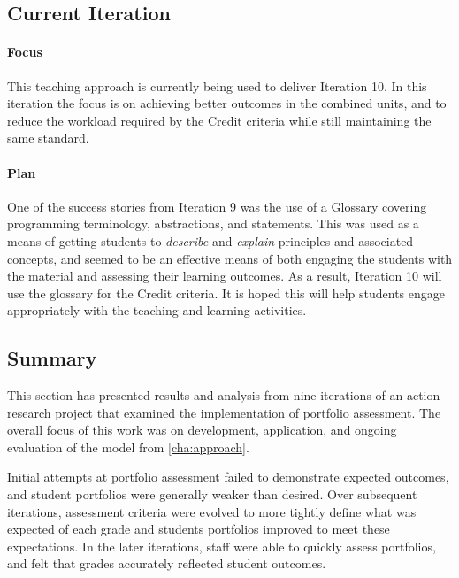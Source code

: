 \subsection{Current Iteration} %

\paragraph{Focus}
This teaching approach is currently being used to deliver Iteration 10. In this iteration the focus is on achieving better outcomes in the combined units, and to reduce the workload required by the Credit criteria while still maintaining the same standard.

\paragraph{Plan}
One of the success stories from Iteration 9 was the use of a Glossary covering programming terminology, abstractions, and statements. This was used as a means of getting students to \emph{describe} and \emph{explain} principles and associated concepts, and seemed to be an effective means of both engaging the students with the material and assessing their learning outcomes. As a result, Iteration 10 will use the glossary for the Credit criteria. It is hoped this will help students engage appropriately with the teaching and learning activities.


\subsection{Summary} %
\label{sub:action_summary}

This section has presented results and analysis from nine iterations of an action research project that examined the implementation of portfolio assessment. The overall focus of this work was on development, application, and ongoing evaluation of the model from \cref{cha:approach}.

Initial attempts at portfolio assessment failed to demonstrate expected outcomes, and student portfolios were generally weaker than desired. Over subsequent iterations, assessment criteria were evolved to more tightly define what was expected of each grade and students portfolios improved to meet these expectations. In the later iterations, staff were able to quickly assess portfolios, and felt that grades accurately reflected student outcomes.

